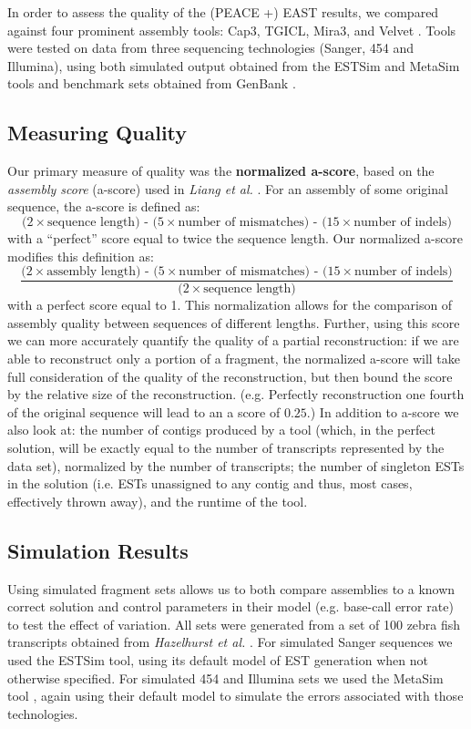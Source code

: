 \documentclass[10pt]{bmc_article}
\newcommand{\peace} {{\small PEACE}}
\newcommand{\capthree} {{\small Cap3}}
\newcommand{\estsim}{{\small ESTSim}}
\newcommand{\metasim} {{\small MetaSim}}
\newcommand{\tgicl} {{\small TGICL}}
\newcommand{\east} {{\small EAST}}
\newcommand{\velvet}{{\small Velvet}}
\newcommand{\mira}{{\small Mira3}}
\newenvironment{bmcformat}{\begin{raggedright}\baselineskip20pt\sloppy\setboolean{publ}{false}}{\end{raggedright}\baselineskip20pt\sloppy}
\begin{document}
\begin{bmcformat}
In order to assess the quality of the (\peace\/ +) \east\/ results, we compared
against four prominent assembly tools: \capthree, \tgicl,
\mira, and \velvet\/ \cite{Huang99,Pertea03,Chevreux04,Zerbino08}.  Tools were tested on data from three
sequencing technologies (Sanger, 454 and Illumina), using both
simulated output obtained from the \estsim\/ and \metasim\/ tools
\cite{Hazelhurst03,Richter08} and benchmark sets obtained from GenBank \cite{Benson10}.  


\subsection*{Measuring Quality}
Our primary measure of quality was the {\bf normalized a-score}, based
on the {\it assembly score} (a-score) used in {\it Liang et al.}
\cite{Liang00}.  For an assembly of some original sequence, the
a-score is defined as:
$$\mbox{($2\times$sequence length) - ($5\times$number of
mismatches) - ($15 \times$number of indels)}$$
with a ``perfect'' score equal to twice the sequence length.  Our
normalized a-score modifies this definition as:
$$\frac{\mbox{($2\times$assembly length) - ($5\times$number of mismatches)
    - ($15\times$number of indels)}}{\mbox{($2\times$sequence
    length)}}$$ with a perfect score equal to 1.  This normalization
allows for the comparison of assembly quality between sequences of
different lengths. Further, using this score we can more accurately
quantify the quality of a partial reconstruction: if we are able to
reconstruct only a portion of a fragment, the normalized a-score will
take full consideration of the quality of the reconstruction, but then
bound the score by the relative size of the reconstruction.
(e.g. Perfectly reconstruction one fourth of the original sequence
will lead to an a score of $0.25$.)  In addition to a-score we also
look at: the number of contigs produced by a tool (which, in the
perfect solution, will be exactly equal to the number of transcripts
represented by the data set), normalized by the number of transcripts;
the number of singleton ESTs in the solution (i.e. ESTs unassigned to
any contig and thus, most cases, effectively thrown away), and the runtime of the tool.

\subsection*{Simulation Results}
Using simulated fragment sets allows us to both compare assemblies to
a known correct solution and control parameters in their model
(e.g. base-call error rate) to test the effect of variation.  All sets
were generated from a set of 100 zebra fish transcripts obtained from
{\it Hazelhurst et al.}  \cite{Hazelhurst08}.  For simulated Sanger
sequences we used the \estsim\/ tool, using its default model of EST
generation when not otherwise specified.  For simulated
454 and Illumina sets we used the \metasim\/ tool \cite{Richter08}, again using their
default model to simulate the errors associated with those
technologies.


\end{bmcformat}
\end{document}
